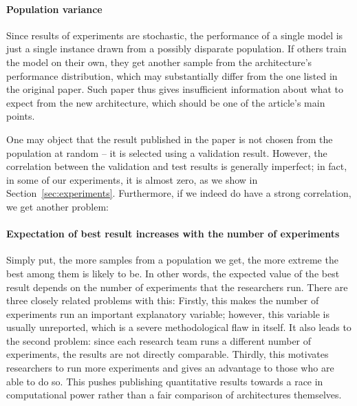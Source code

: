 \documentclass{article}
\begin{document}
\paragraph{Population variance} Since results of experiments are stochastic, the performance of a single model is just a single instance drawn from a possibly disparate population. If others train the model on their own, they get another sample from the architecture's performance distribution, which may substantially differ from the one listed in the original paper. Such paper thus gives insufficient information about what to expect from the new architecture, which should be one of the article's main points.

One may object that the result published in the paper is not chosen from the population at random -- it is selected using a validation result. However, the correlation between the validation and test results is generally imperfect; in fact, in some of our experiments, it is almost zero, as we show in Section~\ref{sec:experiments}. Furthermore, if we indeed do have a strong correlation, we get another problem:

\paragraph{Expectation of best result increases with the number of experiments} Simply put, the more samples from a population we get, the more extreme the best among them is likely to be. In other words, the expected value of the best result depends on the number of experiments that the researchers run. There are three closely related problems with this: Firstly, this makes the number of experiments run an important explanatory variable; however, this variable is usually unreported, which is a severe methodological flaw in itself. It also leads to the second problem: since each research team runs a different number of experiments, the results are not directly comparable.  Thirdly, this motivates researchers to run more experiments and gives an advantage to those who are able to do so. This pushes publishing quantitative results towards a race in computational power rather than a fair comparison of architectures themselves. %
\end{document}
